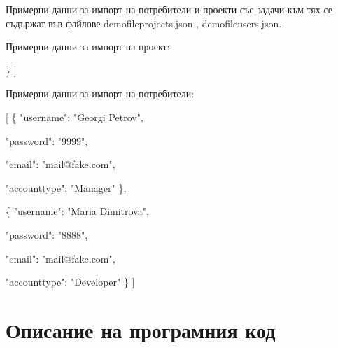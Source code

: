 \documentclass[12pt]{article}
\begin{document}
Примерни данни за импорт на потребители и проекти със задачи към тях се съдържат във файлове demo\textunderscore file\textunderscore projects.json , demo\textunderscore file\textunderscore  users.json. 

Примерни данни за импорт на проект:

\medskip
[

   \medskip
  \{
  
  \medskip
    "name": "DEMO",
    
      \medskip
    "tasks": [
    
      \medskip
      \{
         "title": "Прикачане на изображение",
         
           \medskip
         "tags": "picture,column",
        
          \medskip
         "description": "При отваряне на модал за създаване на стая, да има кламерче за прикачане с действаща функционалност. "
         
           \medskip
      \},
        
          \medskip
      \{
      
        \medskip
         "title": "Download hyperlink",
         
           \medskip
         "tags": "hyperlink,php",
         
           \medskip
         "description": "Когато потребителят кликне на линка, да се сваля файл с име temp.png"
      \}
   ]
   
     \medskip
  \}
]


Примерни данни за импорт на потребители:

  \medskip

[
  \{
      "username": "Georgi Petrov",
      
        \medskip
      "password": "9999",
      
        \medskip
      "email": "mail@fake.com",
      
        \medskip
      "account\textunderscore type": "Manager"
    \},
    
      \medskip
    \{
        "username": "Maria Dimitrova",
        
          \medskip
        "password": "8888",
        
          \medskip
        "email": "mail@fake.com",
        
          \medskip
        "account\textunderscore type": "Developer"
    \} ]

 
\section{Описание на програмния код}
\end{document}
